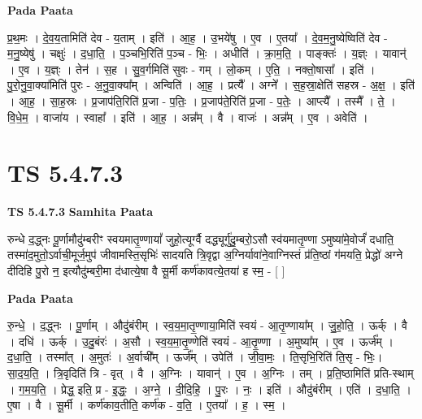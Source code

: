 \documentclass[17pt]{extarticle}
\begin{document}
\textbf{Pada Paata} \newline

प्र॒थ॒मः । दे॒व॒य॒तामिति॑ देव - य॒ताम् । इति॑ । आ॒ह॒ । उ॒भये॑षु । ए॒व । ए॒तया᳚ । दे॒व॒म॒नु॒ष्येष्विति॑ देव - म॒नु॒ष्येषु॑ । चक्षुः॑ । द॒धा॒ति॒ । प॒ञ्चभि॒रिति॑ प॒ञ्च - भिः॒ । अधीति॑ । क्रा॒म॒ति॒ । पाङ्क्तः॑ । य॒ज्ञ्ः । यावान्॑ । ए॒व । य॒ज्ञ्ः । तेन॑ । स॒ह । सु॒व॒र्गमिति॑ सुवः - गम् । लो॒कम् । ए॒ति॒ । नक्तो॒षासा᳚ । इति॑ । पु॒रो॒नु॒वा॒क्या॑मिति॑ पुरः - अ॒नु॒वा॒क्या᳚म् । अन्विति॑ । आ॒ह॒ । प्रत्यै᳚ । अग्ने᳚ । स॒ह॒स्रा॒क्षेति॑ सहस्र - अ॒क्ष॒ । इति॑ । आ॒ह॒ । सा॒ह॒स्रः । प्र॒जाप॑ति॒रिति॑ प्र॒जा - प॒तिः॒ । प्र॒जाप॑ते॒रिति॑ प्र॒जा - प॒तेः॒ । आप्त्यै᳚ । तस्मै᳚ । ते॒ । वि॒धे॒म॒ । वाजा॑य । स्वाहा᳚ । इति॑ । आ॒ह॒ । अन्न᳚म् । वै । वाजः॑ । अन्न᳚म् । ए॒व । अवेति॑ ।  \newline





\section{ TS 5.4.7.3 }

\textbf{TS 5.4.7.3 } \newline
\textbf{Samhita Paata} \newline

रुन्धे द॒द्ध्नः पू॒र्णामौदु॑म्बरीꣳ स्वयमातृ॒ण्णायां᳚ जुहो॒त्यूर्ग्वै दद्ध्यूर्गु॑दु॒म्बरो॒ऽसौ स्व॑यमातृ॒ण्णा ऽमुष्या॑मे॒वोर्जं॑ दधाति॒ तस्मा॑द॒मुतो॒ऽर्वाची॒मूर्ज॒मुप॑ जीवामस्ति॒सृभिः॑ सादयति त्रि॒वृद्वा अ॒ग्निर्यावा॑ने॒वाग्निस्तं प्र॑ति॒ष्ठां ग॑मयति॒ प्रेद्धो॑ अग्ने दीदिहि पु॒रो न॒ इत्यौदु॑म्बरी॒मा द॑धात्ये॒षा वै सू॒र्मी कर्ण॑कावत्ये॒तया॑ ह स्म॒ - [  ] \newline

\textbf{Pada Paata} \newline

रु॒न्धे॒ । द॒द्ध्नः । पू॒र्णाम् । औदु॑बंरीम् । स्व॒य॒मा॒तृ॒ण्णाया॒मिति॑ स्वयं - आ॒तृ॒ण्णाया᳚म् । जु॒हो॒ति॒ । ऊर्क् । वै । दधि॑ । ऊर्क् । उ॒दु॒बंरः॑ । अ॒सौ । स्व॒य॒मा॒तृ॒ण्णेति॑ स्वयं - आ॒तृ॒ण्णा । अ॒मुष्या᳚म् । ए॒व । ऊर्ज᳚म् । द॒धा॒ति॒ । तस्मा᳚त् । अ॒मुतः॑ । अ॒र्वाची᳚म् । ऊर्ज᳚म् । उपेति॑ । जी॒वा॒मः॒ । ति॒सृभि॒रिति॑ ति॒सृ - भिः॒। सा॒द॒य॒ति॒ । त्रि॒वृदिति॑ त्रि - वृत् । वै । अ॒ग्निः । यावान्॑ । ए॒व । अ॒ग्निः । तम् । प्र॒ति॒ष्ठामिति॑ प्रति-स्थाम् । ग॒म॒य॒ति॒ । प्रेद्ध॒ इति॒ प्र - इ॒द्धः॒ । अ॒ग्ने॒ । दी॒दि॒हि॒ । पु॒रः । नः॒ । इति॑ । औदु॑बंरीम् । एति॑ । द॒धा॒ति॒ । ए॒षा । वै । सू॒र्मी । कर्ण॑काव॒तीति॒ कर्ण॑क - व॒ति॒ । ए॒तया᳚ । ह॒ । स्म॒ ।  \newline
\end{document}
